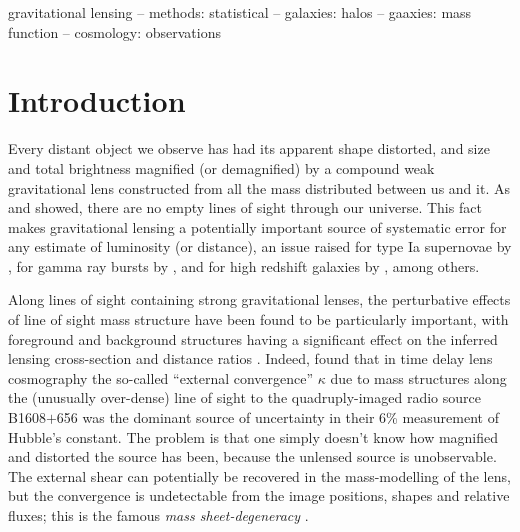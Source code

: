 \documentclass[useAMS,usenatbib]{mn2e}
\begin{document}
\begin{keywords}
  gravitational lensing   --
  methods: statistical    --
  galaxies: halos         --
  gaaxies: mass function  --
  cosmology: observations
\end{keywords}

\setcounter{footnote}{1}


\section{Introduction}

Every distant object we observe has had its apparent shape distorted,
and size and total brightness magnified (or demagnified) by a compound
weak gravitational lens constructed from all the mass distributed
between us and it. As \citet{Vale+White2003} and \citet{HilbertEtal2007}
showed, there are no empty lines of sight through our universe. This
fact makes gravitational lensing a potentially important source of
systematic error for any estimate of luminosity (or distance), an issue
raised for \eg type Ia supernovae by
\citet[][]{Holz+Wald1998,Linder+Holz2004}, for gamma ray bursts by
\citet[][]{Oguri+Takahashi2006,Wang+Dai2011},  and for high redshift
galaxies by \citet{BradacEtal2009}, among others. 

Along lines of sight containing strong gravitational lenses, the
perturbative effects of line of sight mass structure have been found to
be particularly important, with foreground and background structures
having a significant effect on the inferred lensing cross-section
\citep[\eg][]{WongEtal2012} and distance ratios
\citep[][]{DalalEtal2005}. Indeed, \citet{SuyuEtal2010} found that in
time delay lens cosmography the so-called ``external convergence''
$\kappa$ due to mass structures along the (unusually over-dense) line
of sight to the quadruply-imaged radio source B1608$+$656 was the
dominant source of uncertainty in their 6\% measurement of Hubble's
constant. The problem is that one simply doesn't know how magnified and
distorted the source has been, because the unlensed source is
unobservable. The external shear can potentially be recovered in the
mass-modelling of the lens, but the convergence is undetectable from the
image positions, shapes and relative fluxes; this is the famous {\emph{ 
mass sheet-degeneracy}} \citep[see e.g.][for details]{FalcoEtal1985}.
\end{document}
